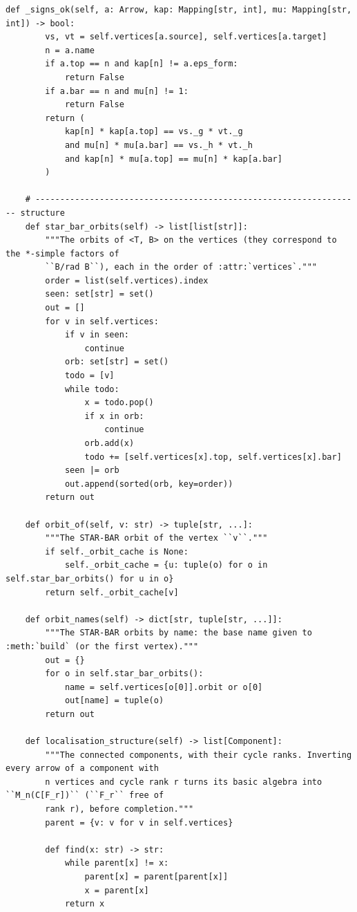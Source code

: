 \documentclass[12pt, a4paper]{report}
\theoremstyle{plain}
\theoremstyle{definition}
\theoremstyle{remark}
\theoremstyle{plain}
\begin{document}
\begin{lstlisting}[style=dsqcode]
    def _signs_ok(self, a: Arrow, kap: Mapping[str, int], mu: Mapping[str, int]) -> bool:
        vs, vt = self.vertices[a.source], self.vertices[a.target]
        n = a.name
        if a.top == n and kap[n] != a.eps_form:
            return False
        if a.bar == n and mu[n] != 1:
            return False
        return (
            kap[n] * kap[a.top] == vs._g * vt._g
            and mu[n] * mu[a.bar] == vs._h * vt._h
            and kap[n] * mu[a.top] == mu[n] * kap[a.bar]
        )

    # ------------------------------------------------------------------ structure
    def star_bar_orbits(self) -> list[list[str]]:
        """The orbits of <T, B> on the vertices (they correspond to the *-simple factors of
        ``B/rad B``), each in the order of :attr:`vertices`."""
        order = list(self.vertices).index
        seen: set[str] = set()
        out = []
        for v in self.vertices:
            if v in seen:
                continue
            orb: set[str] = set()
            todo = [v]
            while todo:
                x = todo.pop()
                if x in orb:
                    continue
                orb.add(x)
                todo += [self.vertices[x].top, self.vertices[x].bar]
            seen |= orb
            out.append(sorted(orb, key=order))
        return out

    def orbit_of(self, v: str) -> tuple[str, ...]:
        """The STAR-BAR orbit of the vertex ``v``."""
        if self._orbit_cache is None:
            self._orbit_cache = {u: tuple(o) for o in self.star_bar_orbits() for u in o}
        return self._orbit_cache[v]

    def orbit_names(self) -> dict[str, tuple[str, ...]]:
        """The STAR-BAR orbits by name: the base name given to :meth:`build` (or the first vertex)."""
        out = {}
        for o in self.star_bar_orbits():
            name = self.vertices[o[0]].orbit or o[0]
            out[name] = tuple(o)
        return out

    def localisation_structure(self) -> list[Component]:
        """The connected components, with their cycle ranks. Inverting every arrow of a component with
        n vertices and cycle rank r turns its basic algebra into ``M_n(C[F_r])`` (``F_r`` free of
        rank r), before completion."""
        parent = {v: v for v in self.vertices}

        def find(x: str) -> str:
            while parent[x] != x:
                parent[x] = parent[parent[x]]
                x = parent[x]
            return x


\end{lstlisting}
\end{document}
